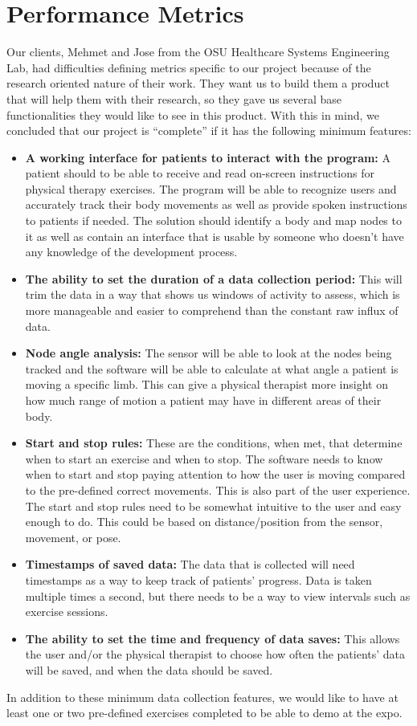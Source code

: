 \documentclass[onecolumn, draftclsnofoot,10pt, compsoc]{IEEEtran}
\begin{document}
\section{Performance Metrics}
Our clients, Mehmet and Jose from the OSU Healthcare Systems Engineering Lab, had difficulties defining metrics specific to our project because of the research oriented nature of their work. They want us to build them a product that will help them with their research, so they gave us several base functionalities they would like to see in this product. With this in mind, we concluded that our project is “complete” if it has the following minimum features:
\begin{itemize}
    \item \textbf{A working interface for patients to interact with the program:} A patient should to be able to receive and read on-screen instructions for physical therapy exercises. The program will be able to recognize users and accurately track their body movements as well as provide spoken instructions to patients if needed. The solution should identify a body and map nodes to it as well as contain an interface that is usable by someone who doesn't have any knowledge of the development process.
    \item \textbf{The ability to set the duration of a data collection period:} This will trim the data in a way that shows us windows of activity to assess, which is more manageable and easier to comprehend than the constant raw influx of data.
    \item \textbf{Node angle analysis:} The sensor will be able to look at the nodes being tracked and the software will be able to calculate at what angle a patient is moving a specific limb. This can give a physical therapist more insight on how much range of motion a patient may have in different areas of their body. 
    \item \textbf{Start and stop rules:} These are the conditions, when met, that determine when to start an exercise and when to stop. The software needs to know when to start and stop paying attention to how the user is moving compared to the pre-defined correct movements. This is also part of the user experience. The start and stop rules need to be somewhat intuitive to the user and easy enough to do. This could be based on distance/position from the sensor, movement, or pose.
    \item \textbf{Timestamps of saved data:} The data that is collected will need timestamps as a way to keep track of patients' progress. Data is taken multiple times a second, but there needs to be a way to view intervals such as exercise sessions.
    \item \textbf{The ability to set the time and frequency of data saves:} This allows the user and/or the physical therapist to choose how often the patients' data will be saved, and when the data should be saved.
\end{itemize}
In addition to these minimum data collection features, we would like to have at least one or two pre-defined exercises completed to be able to demo at the expo.
\end{document}
